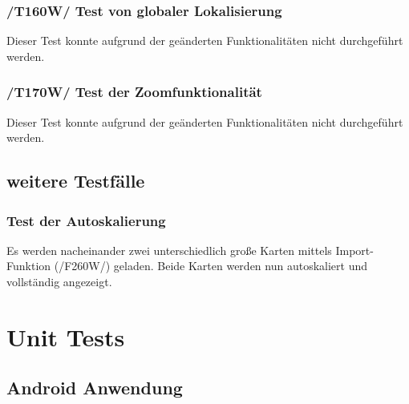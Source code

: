 \documentclass[10pt,a4paper]{article}
\begin{document}
			\subsubsection{/T160W/ Test von globaler Lokalisierung}
			Dieser Test konnte aufgrund der ge\"anderten Funktionalit\"aten nicht durchgef\"uhrt werden.
			
			\subsubsection{/T170W/ Test der Zoomfunktionalit\"at}
			Dieser Test konnte aufgrund der ge\"anderten Funktionalit\"aten nicht durchgef\"uhrt werden.
		
		\subsection{weitere Testfälle}
					\subsubsection{Test der Autoskalierung}
					Es werden nacheinander zwei unterschiedlich gro\ss e Karten mittels Import-Funktion (/F260W/) geladen. Beide Karten
					werden nun autoskaliert und vollst\"andig angezeigt.
	
	\section{Unit Tests}
		\subsection{Android Anwendung}
		
\end{document}
